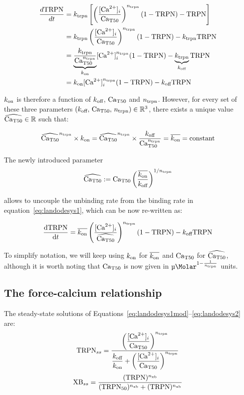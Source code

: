 \begin{align}
    \frac{d\text{TRPN}}{dt} &=\ktrpn\left[\left(\frac{\Cai}{\Caift}\right)^{\ntrpn}(1-\trpn)-\trpn\right] \\
    &= \ktrpn\left(\frac{\Cai}{\Caift}\right)^{\ntrpn}(1-\trpn)-\ktrpn\trpn \\
    &= \underbrace{\frac{\ktrpn}{\Caift^{\ntrpn}}}_{\kon}\Cai^{\ntrpn}(1-\trpn)-\underbrace{\ktrpn}_{\koff}\trpn \\
    &= \kon\Cai^{\ntrpn}(1-\trpn)-\koff\trpn
\end{align}

\noindent
$\kon$ is therefore a function of $\koff$, $\Caift$ and $\ntrpn$. However, for every set of these three parameters $(\koff,\,\Caift,\,\ntrpn)\in\mathbb{R}^{3}$, there exists a unique value $\widehat{\Caift}\in\mathbb{R}$ such that:

\begin{equation}
    \widehat{\Caift}^{\ntrpn}\times\kon = \widehat{\Caift}^{\ntrpn}\times\frac{\koff}{\Caift^{\ntrpn}} = \overline{\kon} = \text{constant}
\end{equation}

\noindent
The newly introduced parameter
%
\begin{equation}
    \widehat{\Caift} := \Caift\left(\frac{\overline{\kon}}{\koff}\right)^{1/\ntrpn}
\end{equation}

\noindent
allows to uncouple the unbinding rate from the binding rate in equation~\eqref{eq:landodesys1}, which can be now re-written as:

\begin{equation}\label{eq:landodesys1mod}
    \der{\trpn}{t} = \overline{\kon}\left(\frac{\Cai}{\widehat{\Caift}}\right)^{\ntrpn}(1-\trpn)-\koff\trpn 
\end{equation}

\noindent
To simplify notation, we will keep using $\kon$ for $\overline{\kon}$ and $\Caift$ for $\widehat{\Caift}$, although it is worth noting that $\Caift$ is now given in $\SI{}{\micro\Molar}^{1-\frac{1}{\ntrpn}}$ units.


%
%
%
\subsection{The force-calcium relationship}
The steady-state solutions of Equations~\eqref{eq:landodesys1mod}--\eqref{eq:landodesys2} are:
%
\begin{equation}\label{eq:landodesys1_ss}
    \trpn_{ss} = \dfrac{\left(\dfrac{\Cai}{\Caift}\right)^{\ntrpn}}{\dfrac{\koff}{\kon}+\left(\dfrac{\Cai}{\Caift}\right)^{\ntrpn}}
\end{equation}
%
\begin{equation}\label{eq:landodesys2_ss}
    \xb_{ss} = \frac{(\trpn)^{\nxb}}{(\trpnf)^{\nxb}+(\trpn)^{\nxb}}
\end{equation}

